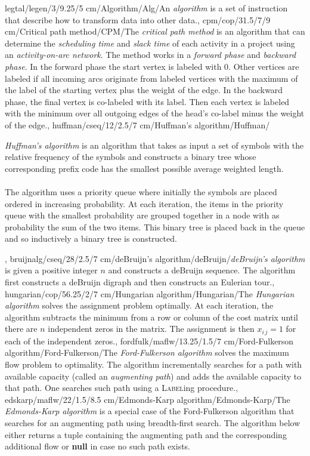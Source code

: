 legtal/legen/3/9.25/5 cm/Algorithm/Alg/{An \emph{algorithm} is a set of instruction that describe how to transform data into other data.},
cpm/cop/31.5/7/9 cm/{Critical path method}/{CPM}/{The \emph{critical path method} is an algorithm that can determine the \emph{scheduling time} and \emph{slack time} of each activity in a project using an \emph{activity-on-arc network}. The method works in a \emph{forward phase} and \emph{backward phase}. In the forward phase the start vertex is labeled with $0$. Other vertices are labeled if all incoming arcs originate from labeled vertices with the maximum of the label of the starting vertex plus the weight of the edge. In the backward phase, the final vertex is co-labeled with its label. Then each vertex is labeled with the minimum over all outgoing edges of the head's co-label minus the weight of the edge.},
huffman/cseq/12/2.5/7 cm/{Huffman's algorithm}/{Huffman}/{\emph{Huffman's algorithm} is an algorithm that takes as input a set of symbols with the relative frequency of the symbols and constructs a binary tree whose corresponding prefix code has the smallest possible average weighted length.\paragraph{}The algorithm uses a priority queue where initially the symbols are placed ordered in increasing probability. At each iteration, the items in the priority queue with the smallest probability are grouped together in a node with as probability the sum of the two items. This binary tree is placed back in the queue and so inductively a binary tree is constructed.},
bruijnalg/cseq/28/2.5/7 cm/{deBruijn's algorithm}/{deBruijn}/{\emph{deBruijn's algorithm} is given a positive integer $n$ and constructs a deBruijn sequence. The algorithm first constructs a deBruijn digraph and then constructs an Eulerian tour.},
hungarian/cop/56.25/2/7 cm/{Hungarian algorithm}/{Hungarian}/{The \emph{Hungarian algorithm} solves the assignment problem optimally. At each iteration, the algorithm subtracts the minimum from a row or column of the cost matrix until there are $n$ independent zeros in the matrix. The assignment is then $x_{i\,j}=1$ for each of the independent zeros.},
fordfulk/maflw/13.25/1.5/7 cm/{Ford-Fulkerson algorithm}/{Ford-Fulkerson}/{The \emph{Ford-Fulkerson algorithm} solves the maximum flow problem to optimality. The algorithm incrementally searches for a path with available capacity (called an \emph{augmenting path}) and adds the available capacity to that path. One searches such path using a \textsc{Label}ing procedure.},
edskarp/maflw/22/1.5/8.5 cm/{Edmonds-Karp algorithm}/{Edmonds-Karp}/{The \emph{Edmonds-Karp algorithm} is a special case of the Ford-Fulkerson algorithm that searches for an augmenting path using breadth-first search. The algorithm below either returns a tuple containing the augmenting path and the corresponding additional flow or \textbf{null} in case no such path exists.}